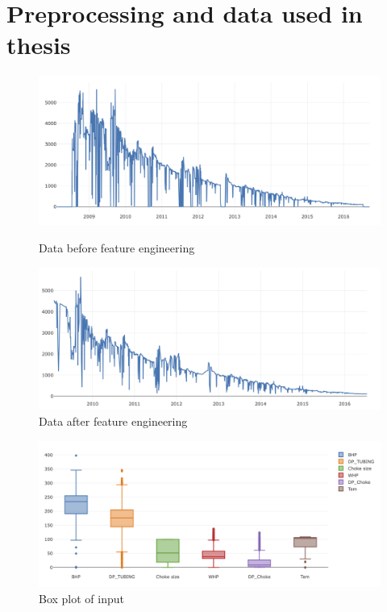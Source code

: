 \documentclass[12pt,a4paper]{report}
\begin{document}
\appendix
\appendixheaderoff
\chapter{Preprocessing and data used in thesis}

\begin{figure}[H]
  \includegraphics[width=\linewidth]{Preprocessing/1}
  \caption{Data before feature engineering}\label{fig:awesome_image1}
\endminipage\hfill
{}
  \includegraphics[width=\linewidth]{Preprocessing/2}
  \caption{Data after feature engineering}\label{fig:awesome_image2}
\endminipage\hfill
\end{figure}



\begin{figure}[H]
  \centering
  \includegraphics[width=\linewidth]{Preprocessing/box}
  \caption{Box plot of input}
\end{figure}
\end{document}
